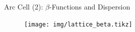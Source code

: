 \documentclass{beamer}
\begin{document}
%
\begin{frame}[t,fragile]{Arc Cell (2): $\beta$-Functions and Dispersion}
\begin{figure}
\centering
\texttt{[image: img/lattice\_beta.tikz]}
\end{figure}
\end{frame}
%
%
%
\end{document}
